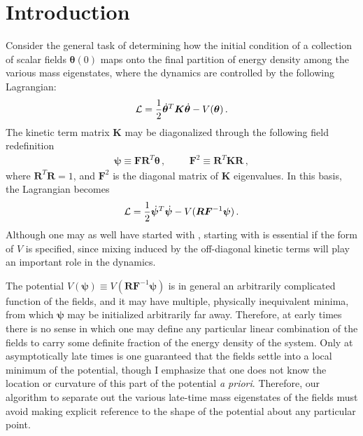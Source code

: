 \documentclass{article}
\begin{document}
\section{Introduction}
Consider the general task of determining how the initial condition of a collection of scalar fields $\bm \theta(0)$ maps onto the final partition of energy density among the various mass eigenstates, where the dynamics are controlled by the following Lagrangian:
\begin{align}\label{eqn:fundamental}
    {\cal L} = \frac{1}{2}\dot{\bm \theta}^T {\bm K}\dot{\bm\theta} - V(\bm\theta)\,.
\end{align}
The kinetic term matrix $\bm K$ may be diagonalized through the following field redefinition
\begin{align}
    \bm\psi \equiv \bm F \bm R^T \bm\theta\,,\hspace{1cm}\bm F^2\equiv \bm R^T \bm K \bm R\,,
\end{align}
where $\bm R^T \bm R  = 1$, and $\bm F^2$ is the diagonal matrix of $\bm K$ eigenvalues. In this basis, the Lagrangian becomes
\begin{align}\label{eqn:canonical}
    {\cal L} = \frac12\dot{\bm\psi}^T\dot{\bm\psi} - V(\bm R\bm F^{-1}\bm\psi)\,.
\end{align}
Although one may as well have started with , starting with  is essential if the form of $V$ is specified, since mixing induced by the off-diagonal kinetic terms will play an important role in the dynamics.

The potential $V(\bm\psi)\equiv V(\bm R\bm F^{-1}\bm\psi)$ is in general an arbitrarily complicated function of the fields, and it may have multiple, physically inequivalent minima, from which $\bm\psi$ may be initialized arbitrarily far away. Therefore, at early times there is no sense in which one may define any particular linear combination of the fields to carry some definite fraction of the energy density of the system. Only at asymptotically late times is one guaranteed that the fields settle into a local minimum of the potential, though I emphasize that one does not know the location or curvature of this part of the potential \emph{a priori}. Therefore, our algorithm to separate out the various late-time mass eigenstates of the fields must avoid making explicit reference to the shape of the potential about any particular point.
\end{document}
